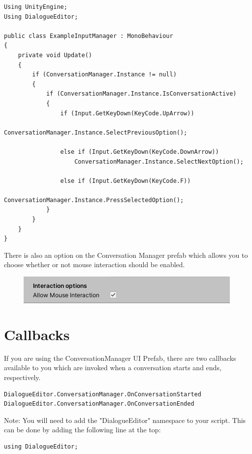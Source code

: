\documentclass[a4paper,12pt]{article}
\begin{document}
\begin{lstlisting}
Using UnityEngine;
Using DialogueEditor;

public class ExampleInputManager : MonoBehaviour
{
	private void Update()	
	{
		if (ConversationManager.Instance != null)
		{
			if (ConversationManager.Instance.IsConversationActive)
			{
				if (Input.GetKeyDown(KeyCode.UpArrow))
					ConversationManager.Instance.SelectPreviousOption();
					    
				else if (Input.GetKeyDown(KeyCode.DownArrow))
					ConversationManager.Instance.SelectNextOption();
					
				else if (Input.GetKeyDown(KeyCode.F))
					ConversationManager.Instance.PressSelectedOption();
			}
		}
	}
}
\end{lstlisting}
\bigskip

There is also an option on the Conversation Manager prefab which allows you to choose whether or not mouse interaction should be enabled.

\begin{figure}[ht]
\centering
\includegraphics[keepaspectratio]{img/AllowMouseInteraction.png}
\end{figure}

\newpage

\section{Callbacks}
\hypertarget{_callbacks}{}

If you are using the ConversationManager UI Prefab, there are two callbacks available to you which are invoked when a conversation starts and ends, respectively.
\bigskip

\begin{lstlisting}
DialogueEditor.ConversationManager.OnConversationStarted
DialogueEditor.ConversationManager.OnConversationEnded
\end{lstlisting}
\bigskip

Note: You will need to add the "DialogueEditor" namespace to your script. This can be done by adding the following line at the top:
\bigskip

\begin{lstlisting}
using DialogueEditor;
\end{lstlisting}
\bigskip
\end{document}
